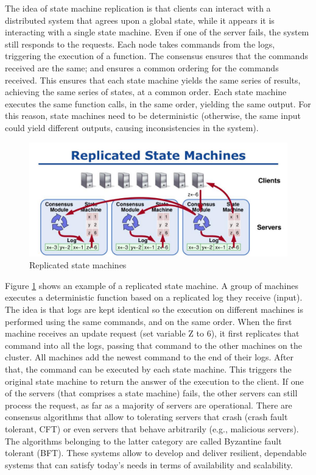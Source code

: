 \documentclass[12pt,a4paper]{article}
\begin{document}
The idea of state machine replication is that clients can interact with a distributed system that agrees upon a global state, while it appears it is interacting with a single state machine. Even if one of the server fails, the system still responds to the requests. Each node takes commands from the logs, triggering the execution of a function. The consensus ensures that the commands received are the same; and ensures a common ordering for the commands received. This ensures that each state machine yields the same series of results, achieving the same series of states, at a common order. Each state machine executes the same function calls, in the same order, yielding the same output. For this reason, state machines need to be deterministic (otherwise, the same input could yield different outputs, causing inconsistencies in the system).
 
 \begin{figure}[h!]
    \centering
    \includegraphics[scale=0.25]{figures/rsm.png}
    \caption{Replicated state machines \cite{replicated}}
    \label{fig:rms}
\end{figure}

Figure \ref{fig:rms} shows an example of a replicated state machine. A group of machines executes a deterministic function based on a replicated log they receive (input). The idea is that logs are kept identical so the execution on different machines is performed using the same commands, and on the same order. When the first machine receives an update request (set variable Z to 6), it first replicates that command into all the logs, passing that command to the other machines on the cluster. All machines add the newest command to the end of their logs. After that, the command can be executed by each state machine. This triggers the original state machine to return the answer of the execution to the client. If one of the servers (that comprises a state machine) fails, the other servers can still process the request, as far as a majority of servers are operational. There are consensus algorithms that allow to tolerating servers that crash (crash fault tolerant, CFT) or even servers that behave arbitrarily (e.g., malicious servers). The algorithms belonging to the latter category are called Byzantine fault tolerant (BFT). These systems allow to develop and deliver resilient, dependable systems that can satisfy today's needs in terms of availability and scalability.
\end{document}
